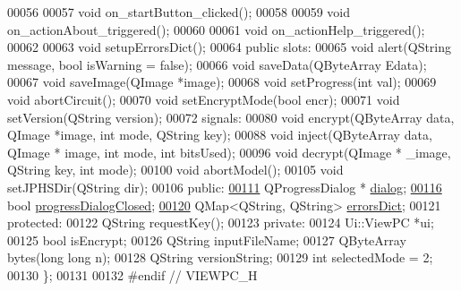 \begin{DoxyCode}
00056 
00057     \textcolor{keywordtype}{void} on\_startButton\_clicked();
00058 
00059     \textcolor{keywordtype}{void} on\_actionAbout\_triggered();
00060 
00061     \textcolor{keywordtype}{void} on\_actionHelp\_triggered();
00062 
00063     \textcolor{keywordtype}{void} setupErrorsDict();
00064 \textcolor{keyword}{public} slots:
00065     \textcolor{keywordtype}{void} alert(QString message, \textcolor{keywordtype}{bool} isWarning = \textcolor{keyword}{false});
00066     \textcolor{keywordtype}{void} saveData(QByteArray Edata);
00067     \textcolor{keywordtype}{void} saveImage(QImage *image);
00068     \textcolor{keywordtype}{void} setProgress(\textcolor{keywordtype}{int} val);
00069     \textcolor{keywordtype}{void} abortCircuit();
00070     \textcolor{keywordtype}{void} setEncryptMode(\textcolor{keywordtype}{bool} encr);
00071     \textcolor{keywordtype}{void} setVersion(QString version);
00072 signals:
00080     \textcolor{keywordtype}{void} encrypt(QByteArray data, QImage *image, \textcolor{keywordtype}{int} mode, QString key);
00088     \textcolor{keywordtype}{void} inject(QByteArray data, QImage * image, \textcolor{keywordtype}{int} mode, \textcolor{keywordtype}{int} bitsUsed);
00096     \textcolor{keywordtype}{void} decrypt(QImage * \_image, QString key, \textcolor{keywordtype}{int} mode);
00100     \textcolor{keywordtype}{void} abortModel();
00105     \textcolor{keywordtype}{void} setJPHSDir(QString dir);
00106 \textcolor{keyword}{public}:
\hypertarget{viewpc_8h_source.tex_l00111}{}\hyperlink{class_view_p_c_a31abbb470fe329b44e6ffee202b903ca}{00111}     QProgressDialog * \hyperlink{class_view_p_c_a31abbb470fe329b44e6ffee202b903ca}{dialog};
\hypertarget{viewpc_8h_source.tex_l00116}{}\hyperlink{class_view_p_c_add8c82aa2b0b934212aa5bde9277ab36}{00116}     \textcolor{keywordtype}{bool} \hyperlink{class_view_p_c_add8c82aa2b0b934212aa5bde9277ab36}{progressDialogClosed};
\hypertarget{viewpc_8h_source.tex_l00120}{}\hyperlink{class_view_p_c_aaf7f058e5589d65fec72a21abfd5629b}{00120}     QMap<QString, QString> \hyperlink{class_view_p_c_aaf7f058e5589d65fec72a21abfd5629b}{errorsDict};
00121 \textcolor{keyword}{protected}:
00122     QString requestKey();
00123 \textcolor{keyword}{private}:
00124     Ui::ViewPC *ui;
00125     \textcolor{keywordtype}{bool} isEncrypt;
00126     QString inputFileName;
00127     QByteArray bytes(\textcolor{keywordtype}{long} \textcolor{keywordtype}{long} n);
00128     QString versionString;
00129     \textcolor{keywordtype}{int} selectedMode = 2;
00130 \};
00131 
00132 \textcolor{preprocessor}{#endif // VIEWPC\_H}
\end{DoxyCode}
